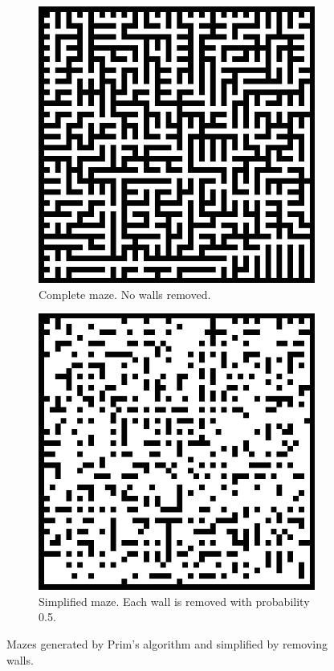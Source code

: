 \documentclass{article}
\begin{document}
\begin{figure}[H]
    \centering
    \begin{subfigure}[b]{0.3\textwidth}
        \includegraphics[width=\textwidth]{./maze_easyfy_1.png}
        \caption{Complete maze. No walls removed.}
    \end{subfigure}
    \quad \quad
    \begin{subfigure}[b]{0.3\textwidth}
        \includegraphics[width=\textwidth]{./maze_easyfy_05.png}
        \caption{Simplified maze. Each wall is removed with probability 0.5.}
    \end{subfigure}
    \caption{Mazes generated by Prim's algorithm and simplified by removing
    walls.}
\end{figure}
\end{document}
